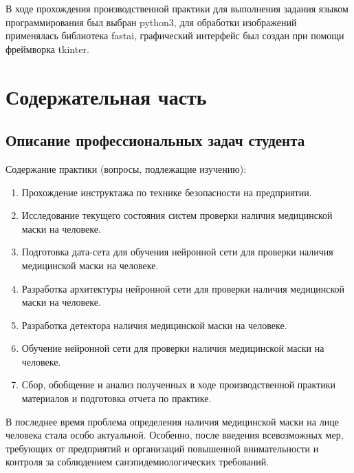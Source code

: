 \documentclass[a4paper,14pt]{article}
\begin{document}
	В ходе прохождения производственной практики для выполнения задания языком программирования был выбран python3, для обработки изображений применялась библиотека fastai, графический интерфейс был создан при помощи фреймворка tkinter.
	
	\pagebreak
	\section{Содержательная часть}
	
	\subsection{Описание профессиональных задач студента}
	
	Содержание практики (вопросы, подлежащие изучению):
	
	\begin{enumerate}
		
		\item Прохождение инструктажа по технике безопасности на предприятии.
		
		\item Исследование текущего состояния систем проверки наличия медицинской маски на человеке.
		
		\item Подготовка дата-сета для обучения нейронной сети для проверки наличия медицинской маски на человеке.
		
		\item Разработка архитектуры нейронной сети для проверки наличия медицинской маски на человеке.
		
		\item Разработка детектора наличия медицинской маски на человеке.
		
		\item Обучение нейронной сети для проверки наличия медицинской маски на человеке.
		
		\item Сбор, обобщение и анализ полученных в ходе производственной практики материалов и подготовка отчета по практике.
		
	\end{enumerate}
	
	В последнее время проблема определения наличия медицинской маски на лице человека стала особо актуальной.
	Особенно, после введения всевозможных мер, требующих от предприятий и организаций повышенной внимательности и контроля за соблюдением санэпидемиологических требований.
	
\end{document}
